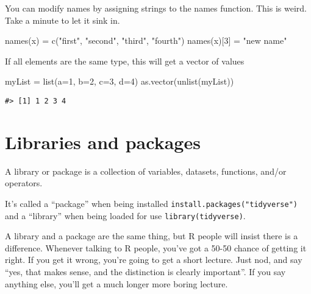 \documentclass[
]{book}
\newenvironment{Shaded}{\begin{snugshade}}{\end{snugshade}}
\newcommand{\AttributeTok}[1]{\textcolor[rgb]{0.77,0.63,0.00}{#1}}
\newcommand{\DecValTok}[1]{\textcolor[rgb]{0.00,0.00,0.81}{#1}}
\newcommand{\FunctionTok}[1]{\textcolor[rgb]{0.00,0.00,0.00}{#1}}
\newcommand{\NormalTok}[1]{#1}
\newcommand{\OtherTok}[1]{\textcolor[rgb]{0.56,0.35,0.01}{#1}}
\newcommand{\StringTok}[1]{\textcolor[rgb]{0.31,0.60,0.02}{#1}}
\begin{document}
You can modify names by assigning strings to the names function. This is weird. Take a minute to let it sink in.

\begin{Shaded}
\begin{Highlighting}[]
\FunctionTok{names}\NormalTok{(x) }\OtherTok{=} \FunctionTok{c}\NormalTok{(}\StringTok{"first"}\NormalTok{, }\StringTok{"second"}\NormalTok{, }\StringTok{"third"}\NormalTok{, }\StringTok{"fourth"}\NormalTok{)}
\FunctionTok{names}\NormalTok{(x)[}\DecValTok{3}\NormalTok{] }\OtherTok{=} \StringTok{"new name"}
\end{Highlighting}
\end{Shaded}

If all elements are the same type, this will get a vector of values

\begin{Shaded}
\begin{Highlighting}[]
\NormalTok{myList }\OtherTok{=} \FunctionTok{list}\NormalTok{(}\AttributeTok{a=}\DecValTok{1}\NormalTok{, }\AttributeTok{b=}\DecValTok{2}\NormalTok{, }\AttributeTok{c=}\DecValTok{3}\NormalTok{, }\AttributeTok{d=}\DecValTok{4}\NormalTok{)}
\FunctionTok{as.vector}\NormalTok{(}\FunctionTok{unlist}\NormalTok{(myList))}
\end{Highlighting}
\end{Shaded}

\begin{verbatim}
#> [1] 1 2 3 4
\end{verbatim}

\hypertarget{libraries-and-packages}{%
\chapter{Libraries and packages}\label{libraries-and-packages}}

A library or package is a collection of variables, datasets, functions, and/or operators.

It's called a ``package'' when being installed \texttt{install.packages("tidyverse")} and a ``library'' when being loaded for use \texttt{library(tidyverse)}.

A library and a package are the same thing, but R people will insist there is a difference. Whenever talking to R people, you've got a 50-50 chance of getting it right. If you get it wrong, you're going to get a short lecture. Just nod, and say ``yes, that makes sense, and the distinction is clearly important''. If you say anything else, you'll get a much longer more boring lecture.
\end{document}
